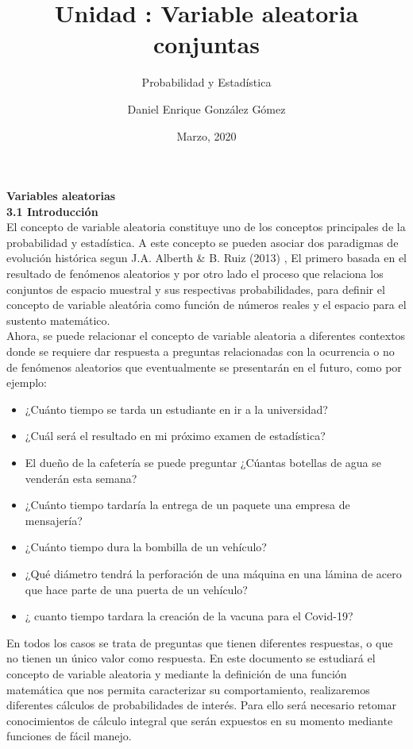 \documentclass[base=hide,12pt]{elegantbook}
\title{Unidad : Variable aleatoria conjuntas}
\subtitle{Probabilidad y Estadística}
\author{Daniel Enrique González Gómez}
\institute{Pontificia Universidad Javeriana Cali}
\date{Marzo, 2020}
\begin{document}
\textcolor{col4}{\LARGE \bf Variables aleatorias}    \\

\textcolor{col4}{\large \bf 3.1 Introducción}\\

El concepto de variable aleatoria constituye uno de los conceptos principales de la probabilidad y estadística. A este concepto se pueden asociar dos paradigmas de evolución histórica segun J.A. Alberth \& B. Ruiz (2013) , El primero basada en el resultado de fenómenos aleatorios y por otro lado el proceso que relaciona los conjuntos de espacio muestral y sus respectivas probabilidades, para definir el concepto de variable aleatória como función de números reales y  el espacio para el sustento matemático. \\

Ahora, se puede relacionar el concepto de variable aleatoria a diferentes contextos donde se requiere dar respuesta a preguntas relacionadas con la ocurrencia o no de fenómenos aleatorios que eventualmente se presentarán en el futuro, como por ejemplo: \\

\begin{itemize}
	\item ¿Cuánto tiempo se tarda un estudiante  en ir a la universidad?
	\item ¿Cuál será  el resultado en mi próximo examen de estadística? 
	\item El dueño de la cafetería se puede preguntar ¿Cúantas botellas de agua se venderán esta semana?
	\item ¿Cuánto  tiempo tardaría  la entrega de un  paquete una empresa  de mensajería?
	\item ¿Cuánto tiempo dura la  bombilla de un  vehículo? 
	\item ¿Qué  diámetro tendrá la  perforación de una máquina en una lámina de acero que hace parte de una puerta de un vehículo?
	\item ¿ cuanto tiempo tardara la creación de la vacuna para el Covid-19?
\end{itemize}
\vspace{.5cm}
En  todos los casos se trata de  preguntas que tienen  diferentes  respuestas, o  que no tienen un único valor como  respuesta.  En este documento  se estudiará el concepto de variable aleatoria y mediante la definición  de una función  matemática que nos  permita caracterizar su  comportamiento, realizaremos diferentes cálculos de probabilidades de interés. Para ello será necesario  retomar conocimientos de cálculo integral que serán  expuestos en su momento mediante funciones de fácil manejo. \\  
\end{document}
